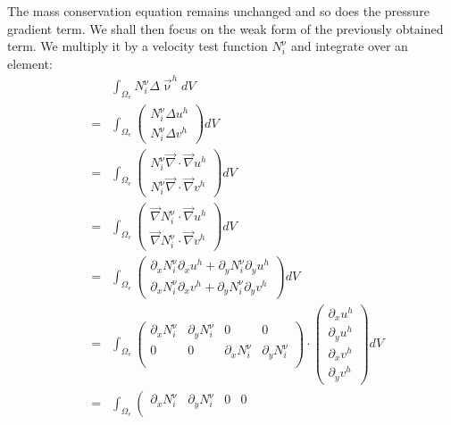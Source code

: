 The mass conservation equation remains unchanged and so does the pressure gradient term. 
We shall then focus on the weak form of the previously obtained term.
We multiply it by a velocity test function $N_i^\upnu$ and integrate over an element: 
\begin{eqnarray}
&&\int_{\Omega_e} N_i^\upnu \Delta \vec\upnu^h dV \nonumber\\
&=&\int_{\Omega_e}  \left(\begin{array}{c}
N_i^\upnu \Delta u^h \\
N_i^\upnu \Delta v^h 
\end{array}\right) dV \nonumber\\
&=&\int_{\Omega_e}  \left(\begin{array}{c}
N_i^\upnu \vec\nabla \cdot \vec\nabla u^h \\
N_i^\upnu \vec\nabla \cdot \vec\nabla v^h 
\end{array}\right) dV \nonumber\\
&=&
\int_{\Omega_e}   \left(\begin{array}{c}
\vec\nabla N_i^\upnu \cdot \vec\nabla u^h \\
\vec\nabla N_i^\upnu \cdot \vec\nabla v^h 
\end{array}\right) dV \nonumber\\
&=&
\int_{\Omega_e}
\left(\begin{array}{c}
\partial_x N_i^\upnu \partial_x u^h + \partial_y N_i^\upnu \partial_y u^h \\ 
\partial_x N_i^\upnu \partial_x v^h + \partial_y N_i^\upnu \partial_y v^h 
\end{array}\right) dV \nonumber\\
&=&\int_{\Omega_e}
\left(
\begin{array}{cccc}
\partial_x N_i^\upnu & \partial_y N_i^\upnu & 0 & 0 \\ 
0 & 0 & \partial_x N_i^\upnu & \partial_y N_i^\upnu  \\ 
\end{array}
\right)
\!\cdot\!
\left(
\begin{array}{c}
\partial_x u^h \\
\partial_y u^h \\
\partial_x v^h \\
\partial_y v^h 
\end{array}
\right) dV \nonumber\\
&=&\int_{\Omega_e}
\left(
\begin{array}{cccc}
\partial_x N_i^\upnu & \partial_y N_i^\upnu & 0 & 0 \\ 

\end{array}
\end{eqnarray}
